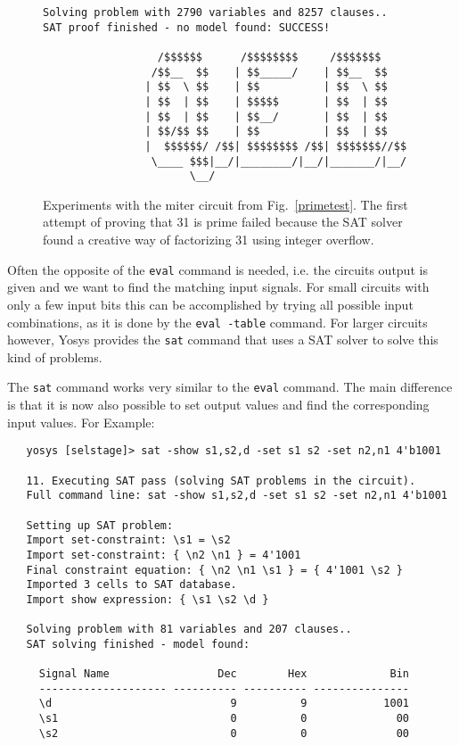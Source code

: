 \documentclass[9pt,technote,a4paper]{IEEEtran}
\begin{document}
\begin{figure*}[!t]
\begin{lstlisting}[basicstyle=\ttfamily\small]
Solving problem with 2790 variables and 8257 clauses..
SAT proof finished - no model found: SUCCESS!

                  /$$$$$$      /$$$$$$$$     /$$$$$$$
                 /$$__  $$    | $$_____/    | $$__  $$
                | $$  \ $$    | $$          | $$  \ $$
                | $$  | $$    | $$$$$       | $$  | $$
                | $$  | $$    | $$__/       | $$  | $$
                | $$/$$ $$    | $$          | $$  | $$
                |  $$$$$$/ /$$| $$$$$$$$ /$$| $$$$$$$//$$
                 \____ $$$|__/|________/|__/|_______/|__/
                       \__/
\end{lstlisting}
\caption{Experiments with the miter circuit from Fig.~\ref{primetest}. The first attempt of proving that 31
is prime failed because the SAT solver found a creative way of factorizing 31 using integer overflow.}
\label{primesat}
\end{figure*}

Often the opposite of the {\tt eval} command is needed, i.e. the circuits
output is given and we want to find the matching input signals. For small
circuits with only a few input bits this can be accomplished by trying all
possible input combinations, as it is done by the {\tt eval -table} command.
For larger circuits however, Yosys provides the {\tt sat} command that uses
a SAT \cite{CircuitSAT} solver \cite{MiniSAT} to solve this kind of problems.

The {\tt sat} command works very similar to the {\tt eval} command. The main
difference is that it is now also possible to set output values and find the
corresponding input values. For Example:

{\scriptsize
\begin{verbatim}
   yosys [selstage]> sat -show s1,s2,d -set s1 s2 -set n2,n1 4'b1001

   11. Executing SAT pass (solving SAT problems in the circuit).
   Full command line: sat -show s1,s2,d -set s1 s2 -set n2,n1 4'b1001

   Setting up SAT problem:
   Import set-constraint: \s1 = \s2
   Import set-constraint: { \n2 \n1 } = 4'1001
   Final constraint equation: { \n2 \n1 \s1 } = { 4'1001 \s2 }
   Imported 3 cells to SAT database.
   Import show expression: { \s1 \s2 \d }

   Solving problem with 81 variables and 207 clauses..
   SAT solving finished - model found:

     Signal Name                 Dec        Hex             Bin
     -------------------- ---------- ---------- ---------------
     \d                            9          9            1001
     \s1                           0          0              00
     \s2                           0          0              00
\end{verbatim}
}
\end{document}
